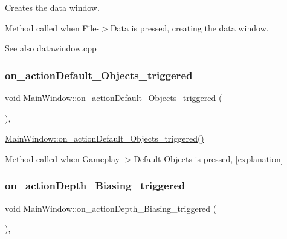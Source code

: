 Creates the data window. 

Method called when File-\/$>$Data is pressed, creating the data window. \begin{DoxySeeAlso}{See also}
datawindow.\+cpp 
\end{DoxySeeAlso}
\mbox{\label{class_main_window_a702f0e3265e104d9a37c6bd5e0df29fb}} 
\subsubsection{\texorpdfstring{on\+\_\+action\+Default\+\_\+\+Objects\+\_\+triggered}{on\_actionDefault\_Objects\_triggered}}
{\footnotesize\ttfamily void Main\+Window\+::on\+\_\+action\+Default\+\_\+\+Objects\+\_\+triggered (\begin{DoxyParamCaption}{ }\end{DoxyParamCaption})\hspace{0.3cm}{\ttfamily [private]}, {\ttfamily [slot]}}



\hyperlink{class_main_window_a702f0e3265e104d9a37c6bd5e0df29fb}{Main\+Window\+::on\+\_\+action\+Default\+\_\+\+Objects\+\_\+triggered()} 

Method called when Gameplay-\/$>$Default Objects is pressed, \mbox{[}explanation\mbox{]} \mbox{\label{class_main_window_a85f9b158b4cf913593135ac5b3321b81}} 
\subsubsection{\texorpdfstring{on\+\_\+action\+Depth\+\_\+\+Biasing\+\_\+triggered}{on\_actionDepth\_Biasing\_triggered}}
{\footnotesize\ttfamily void Main\+Window\+::on\+\_\+action\+Depth\+\_\+\+Biasing\+\_\+triggered (\begin{DoxyParamCaption}{ }\end{DoxyParamCaption})\hspace{0.3cm}{\ttfamily [private]}, {\ttfamily [slot]}}



